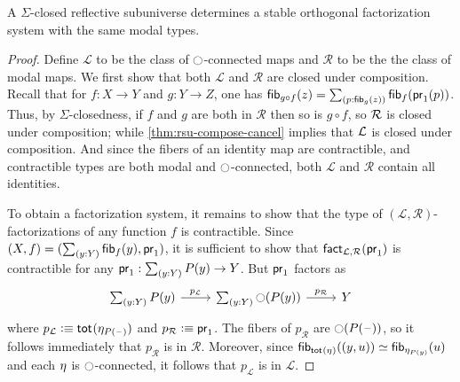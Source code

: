 \begin{thm}\label{thm:sofs_from_ssrs}
A $\Sigma$-closed reflective subuniverse determines a stable orthogonal factorization system with the same
modal types.
\end{thm}

\begin{proof}
Define $\mathcal{L}$ to be the class of $\modal$-connected
maps and $\mathcal{R}$ to be the the class of modal maps.
We first show that both $\mathcal{L}$ and $\mathcal{R}$ are closed under
composition. Recall that for $f:X\to Y$ and $g:Y\to Z$, one has
$\fib{g\circ f}{z}=\sm{p:\fib{g}{z}}\fib{f}{\proj1(p)}$.
Thus, by $\Sigma$-closedness, if $f$ and $g$ are both in $\mathcal{R}$ then so is $g\circ f$, so $\cR$ is closed under composition; while \cref{thm:rsu-compose-cancel} implies that $\cL$ is closed under composition.
And since the fibers of an identity map are contractible, and contractible types are both modal and $\modal$-connected, both $\mathcal{L}$ and $\mathcal{R}$ contain all identities.


To obtain a factorization system,
it remains to show that the type of
$(\mathcal{L},\mathcal{R})$-factorizations of any function $f$ is contractible.
Since $\pairr{X,f}=\pairr{\sm{y:Y}\fib{f}{y},\proj1}$, it is sufficient to
show that $\fact_{\mathcal{L},\mathcal{R}}(\proj1)$ is contractible for any
$\proj1:\sm{y:Y}P(y)\to Y$. But $\proj1$ factors as
\begin{equation*}
\begin{tikzcd}
\sm{y:Y}P(y) \arrow[r,"p_\mathcal{L}"] & \sm{y:Y}\modal(P(y)) \arrow[r,"p_\mathcal{R}"] & Y
\end{tikzcd}
\end{equation*}
where $p_\mathcal{L}\defeq\total{\modalunit[P(\blank)]}$ and $p_\mathcal{R}\defeq\proj1$.
The fibers of $p_\mathcal{R}$ are $\modal(P(\blank))$, so it follows
immediately that $p_\mathcal{R}$ is in $\mathcal{R}$.
Moreover, since
$\eqv{\fib{\total{\modalunit}}{\pairr{y,u}}}{\fib{\modalunit[P(y)]}{u}}$ and each $\modalunit$ is $\modal$-connected, it follows that $p_\mathcal{L}$ is in
$\mathcal{L}$.


\end{proof}
